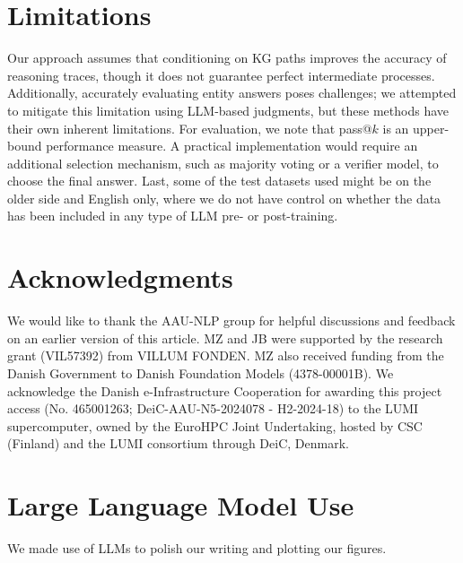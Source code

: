 \documentclass[11pt]{article}
\begin{document}
\section*{Limitations}

Our approach assumes that conditioning on KG paths improves the accuracy of reasoning traces, though it does not guarantee perfect intermediate processes. Additionally, accurately evaluating entity answers poses challenges; we attempted to mitigate this limitation using LLM-based judgments, but these methods have their own inherent limitations. For evaluation, we note that pass@$k$ is an upper-bound performance measure. A practical implementation would require an additional selection mechanism, such as majority voting or a verifier model, to choose the final answer. Last, some of the test datasets used might be on the older side and English only, where we do not have control on whether the data has been included in any type of LLM pre- or post-training.

\section*{Acknowledgments}
We would like to thank the AAU-NLP group for helpful discussions and feedback on an earlier version of this article. 
MZ and JB were supported by the research grant (VIL57392) from VILLUM FONDEN.
MZ also received funding from the Danish Government to Danish Foundation Models (4378-00001B).
We acknowledge the Danish e-Infrastructure Cooperation for awarding this project access (No. 465001263; DeiC-AAU-N5-2024078 - H2-2024-18) to the LUMI supercomputer, owned by the EuroHPC Joint Undertaking, hosted by CSC (Finland) and the LUMI consortium through DeiC, Denmark.

%

\clearpage
\appendix

\section{Large Language Model Use}
We made use of LLMs to polish our writing and plotting our figures.
\end{document}
